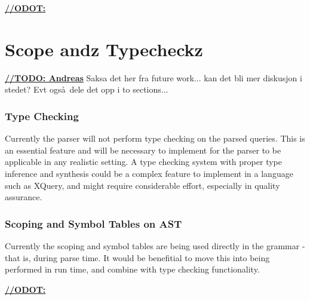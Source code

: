 \underline{\textbf{\LARGE //ODOT:}}


\section{Scope andz Typecheckz}

\underline{\textbf{\LARGE //TODO: Andreas}} Saksa det her fra future work... kan det bli mer diskusjon i stedet? Evt ogs\aa~dele det opp i to sections...

\subsubsection{Type Checking}
Currently the parser will not perform type checking on the parsed queries. This
is an essential feature and will be necessary to implement for the parser to be
applicable in any realistic setting. A type checking system with proper type
inference and synthesis could be a complex feature to implement in a language
such as XQuery, and might require considerable effort, especially in quality
assurance. 

\subsubsection{Scoping and Symbol Tables on AST}
Currently the scoping and symbol tables are being used directly in the grammar -
that is, during parse time. It would be benefitial to move this into being
performed in run time, and combine with type checking functionality.

\underline{\textbf{\LARGE //ODOT:}}